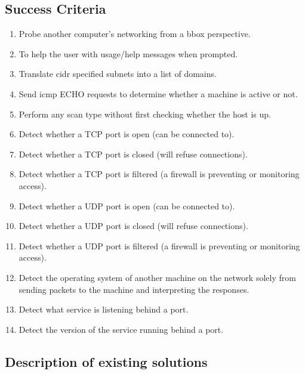 \documentclass[titlepage]{article}
\let\Oldsubsection\subsection{}
\renewcommand{\subsection}{\FloatBarrier\Oldsubsection}
\begin{document}
\subsection{Success Criteria}

\begin{enumerate}

  \item{%
    Probe another computer's networking from a \gls{bbox} perspective.
  }\label{blackbox}
  \item{%
    To help the user with usage/help messages when prompted.  
  }\label{usage}
  \item{%
    Translate \gls{cidr} specified subnets into a list of domains.
  }\label{cidr}
  \item{%
    Send \gls{icmp} ECHO requests to determine whether a machine is active
    or not.
  }\label{ping}
  \item{%
    Perform any scan type without first checking whether the host is up.
  }\label{nocheck}
  \item{%
    Detect whether a TCP port is open (can be connected to).
  }\label{tcpopen}
  \item{%
    Detect whether a TCP port is closed (will refuse connections).
  }\label{tcpclosed}
  \item{%
    Detect whether a TCP port is filtered (a firewall is
    preventing or monitoring access).
  }\label{tcpfiltered}
  \item{%
    Detect whether a UDP port is open (can be connected to).
  }\label{udpopen}
  \item{%
    Detect whether a UDP port is closed (will refuse connections).
  }\label{udpclosed}
  \item{%
    Detect whether a UDP port is filtered (a firewall is
    preventing or monitoring access).
  }\label{udpfiltered}
  \item{%
    Detect the operating system of another machine on the network
    solely from sending packets to the machine and interpreting the responses.
  }\label{osdetect}
  \item{%
    Detect what service is listening behind a port.
  }\label{servicedetect}
  \item{%
    Detect the version of the service running behind a port.
  }\label{versiondetect}

\end{enumerate}

\subsection{Description of existing solutions}
\end{document}
